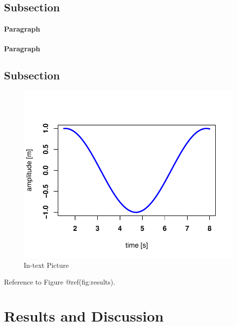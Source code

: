 \documentclass[fleqn,10pt,lineno]{wlpeerj} %
\begin{document}
\lipsum[5] 

\subsection*{Subsection}\label{subsection}

\lipsum[6] 

\paragraph{Paragraph}

\lipsum[7]  \paragraph{Paragraph} \lipsum[8] 

\subsection*{Subsection}\label{subsection-1}

\lipsum[9] 

\begin{figure}
\includegraphics[width=1\linewidth]{paper_files/figure-latex/results-1} \caption{In-text Picture}\label{fig:results}
\end{figure}

Reference to Figure @ref(fig:results).

\section*{Results and Discussion}\label{results-and-discussion}
\end{document}
